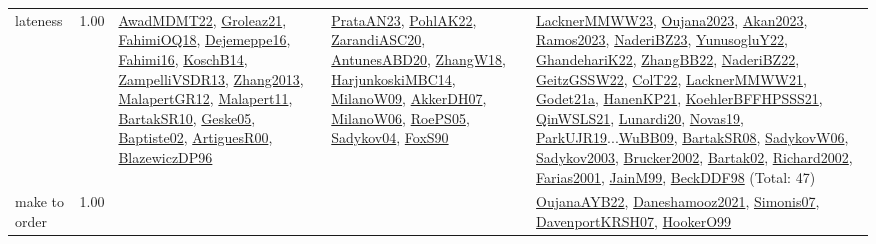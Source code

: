 {\begin{longtable}{p{3cm}r>{\raggedright\arraybackslash}p{6cm}>{\raggedright\arraybackslash}p{6cm}>{\raggedright\arraybackslash}p{8cm}}
\index{lateness}\index{Concepts!lateness}lateness &  1.00 & \hyperref[detail:AwadMDMT22]{AwadMDMT22}, \hyperref[detail:Groleaz21]{Groleaz21}, \hyperref[detail:FahimiOQ18]{FahimiOQ18}, \hyperref[detail:Dejemeppe16]{Dejemeppe16}, \hyperref[detail:Fahimi16]{Fahimi16}, \hyperref[detail:KoschB14]{KoschB14}, \hyperref[detail:ZampelliVSDR13]{ZampelliVSDR13}, \hyperref[detail:Zhang2013]{Zhang2013}, \hyperref[detail:MalapertGR12]{MalapertGR12}, \hyperref[detail:Malapert11]{Malapert11}, \hyperref[detail:BartakSR10]{BartakSR10}, \hyperref[detail:Geske05]{Geske05}, \hyperref[detail:Baptiste02]{Baptiste02}, \hyperref[detail:ArtiguesR00]{ArtiguesR00}, \hyperref[detail:BlazewiczDP96]{BlazewiczDP96} & \hyperref[detail:PrataAN23]{PrataAN23}, \hyperref[detail:PohlAK22]{PohlAK22}, \hyperref[detail:ZarandiASC20]{ZarandiASC20}, \hyperref[detail:AntunesABD20]{AntunesABD20}, \hyperref[detail:ZhangW18]{ZhangW18}, \hyperref[detail:HarjunkoskiMBC14]{HarjunkoskiMBC14}, \hyperref[detail:MilanoW09]{MilanoW09}, \hyperref[detail:AkkerDH07]{AkkerDH07}, \hyperref[detail:MilanoW06]{MilanoW06}, \hyperref[detail:RoePS05]{RoePS05}, \hyperref[detail:Sadykov04]{Sadykov04}, \hyperref[detail:FoxS90]{FoxS90} & \hyperref[detail:LacknerMMWW23]{LacknerMMWW23}, \hyperref[detail:Oujana2023]{Oujana2023}, \hyperref[detail:Akan2023]{Akan2023}, \hyperref[detail:Ramos2023]{Ramos2023}, \hyperref[detail:NaderiBZ23]{NaderiBZ23}, \hyperref[detail:YunusogluY22]{YunusogluY22}, \hyperref[detail:GhandehariK22]{GhandehariK22}, \hyperref[detail:ZhangBB22]{ZhangBB22}, \hyperref[detail:NaderiBZ22]{NaderiBZ22}, \hyperref[detail:GeitzGSSW22]{GeitzGSSW22}, \hyperref[detail:ColT22]{ColT22}, \hyperref[detail:LacknerMMWW21]{LacknerMMWW21}, \hyperref[detail:Godet21a]{Godet21a}, \hyperref[detail:HanenKP21]{HanenKP21}, \hyperref[detail:KoehlerBFFHPSSS21]{KoehlerBFFHPSSS21}, \hyperref[detail:QinWSLS21]{QinWSLS21}, \hyperref[detail:Lunardi20]{Lunardi20}, \hyperref[detail:Novas19]{Novas19}, \hyperref[detail:ParkUJR19]{ParkUJR19}...\hyperref[detail:WuBB09]{WuBB09}, \hyperref[detail:BartakSR08]{BartakSR08}, \hyperref[detail:SadykovW06]{SadykovW06}, \hyperref[detail:Sadykov2003]{Sadykov2003}, \hyperref[detail:Brucker2002]{Brucker2002}, \hyperref[detail:Bartak02]{Bartak02}, \hyperref[detail:Richard2002]{Richard2002}, \hyperref[detail:Farias2001]{Farias2001}, \hyperref[detail:JainM99]{JainM99}, \hyperref[detail:BeckDDF98]{BeckDDF98} (Total: 47)\\
\index{make to order}\index{Concepts!make to order}make to order &  1.00 &  &  & \hyperref[detail:OujanaAYB22]{OujanaAYB22}, \hyperref[detail:Daneshamooz2021]{Daneshamooz2021}, \hyperref[detail:Simonis07]{Simonis07}, \hyperref[detail:DavenportKRSH07]{DavenportKRSH07}, \hyperref[detail:HookerO99]{HookerO99}\\

\end{longtable}}
